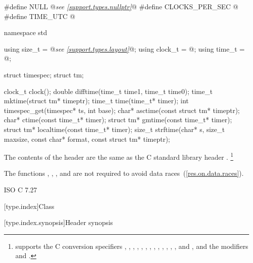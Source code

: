 %
%
%
%
%
%
%
%
%
%
%
%
%
%
%
%
%
%
%
%
\begin{codeblock}
#define NULL @\textit{see \ref{support.types.nullptr}}@
#define CLOCKS_PER_SEC @\seebelow@
#define TIME_UTC @\seebelow@

namespace std {
  using size_t = @\textit{see \ref{support.types.layout}}@;
  using clock_t = @\seebelow@;
  using time_t = @\seebelow@;

  struct timespec;
  struct tm;

  clock_t clock();
  double difftime(time_t time1, time_t time0);
  time_t mktime(struct tm* timeptr);
  time_t time(time_t* timer);
  int timespec_get(timespec* ts, int base);
  char* asctime(const struct tm* timeptr);
  char* ctime(const time_t* timer);
  struct tm* gmtime(const time_t* timer);
  struct tm* localtime(const time_t* timer);
  size_t strftime(char* s, size_t maxsize, const char* format, const struct tm* timeptr);
}
\end{codeblock}

\pnum
{}%
%
%
%
The contents of the header  are the same as the C standard library header .%
\footnote{ supports the C conversion specifiers
, , , , , , ,
, , , , , , and
, and the modifiers  and .}

\pnum
The functions , , , and
 are not required to avoid data
races~(\ref{res.on.data.races}).

\xref ISO C 7.27

[type.index]{Class }

[type.index.synopsis]{Header  synopsis}

